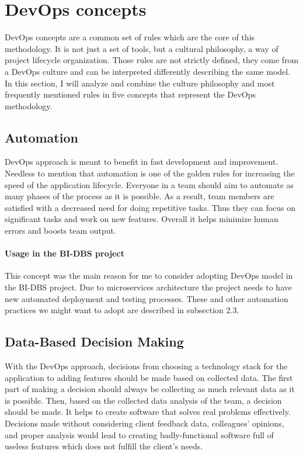 \section{DevOps concepts} DevOps concepts are a common set of rules which are the core of this methodology. It is not just a set of tools, but a cultural philosophy, a way of project lifecycle organization. Those rules are not strictly defined, they come from a DevOps culture and can be interpreted differently describing the same model. In this section, I will analyze and combine the culture philosophy and most frequently mentioned rules\cite{devops-conc1, devops-conc2} in five concepts that represent the DevOps methodology.

\subsection{Automation} DevOps approach is meant to benefit in fast development and improvement. Needless to mention that automation is one of the golden rules for increasing the speed of the application lifecycle. Everyone in a team should aim to automate as many phases of the process as it is possible. As a result, team members are satisfied with a decreased need for doing repetitive tasks. Thus they can focus on significant tasks and work on new features. Overall it helps minimize human errors and boosts team output.

\paragraph*{Usage in the BI-DBS project} This concept was the main reason for me to consider adopting DevOps model in the BI-DBS project. Due to microservices architecture the project needs to have new automated deployment and testing processes. These and other automation practices we might want to adopt are described in subsection 2.3.


\subsection{Data-Based Decision Making} With the DevOps approach, decisions from choosing a technology stack for the application to adding features should be made based on collected data. The first part of making a decision should always be collecting as much relevant data as it is possible. Then, based on the collected data analysis of the team, a decision should be made. It helps to create software that solves real problems effectively. Decisions made without considering client feedback data, colleagues' opinions, and proper analysis would lead to creating badly-functional software full of useless features which does not fulfill the client's needs.


